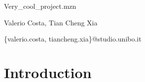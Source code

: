 \documentclass{article}
\begin{document}
    \begin{titlepage}
        \begin{center}
            {\LARGE Very\_cool\_project.mzn}
            \vspace*{1em}
            
            Valerio Costa, Tian Cheng Xia

            \{valerio.costa, tiancheng.xia\}@studio.unibo.it
        \end{center}
    \end{titlepage}


    \section{Introduction}

        
        
        
        
\end{document}
